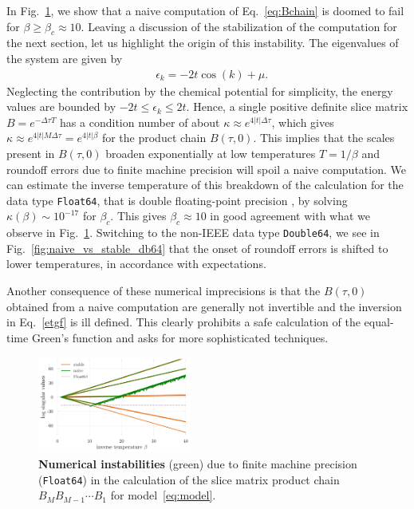\documentclass[%
 reprint,
superscriptaddress,
citeautoscript,
showpacs,
 amsmath,amssymb,
 aps,
 prb,
longbibliography,
]{revtex4-2}
\begin{document}
In Fig.~\ref{fig:naive_vs_stable}, we show that a naive computation of Eq.~\ref{eq:Bchain} is doomed to fail for $\beta \geq \beta_c \approx 10$. Leaving a discussion of the stabilization of the computation for the next section, let us highlight the origin of this instability. The eigenvalues of the system are given by
\begin{align}
	&\epsilon_k = -2t\cos(k) + \mu.
\end{align}
Neglecting the contribution by the chemical potential for simplicity, the energy values are bounded by $-2t \leq \epsilon_k \leq 2t$. Hence, a single positive definite slice matrix $B = e^{-\Delta \tau T}$ has a condition number of about $\kappa \approx e^{4|t|\Delta \tau}$, which gives $\kappa \approx e^{4|t|M\Delta \tau} = e^{4|t|\beta}$ for  the product chain $B(\tau, 0)$. This implies that the scales present in $B(\tau, 0)$ broaden exponentially at low temperatures $T=1/\beta$ and roundoff errors due to finite machine precision will spoil a naive computation. We can estimate the inverse temperature of this breakdown of the calculation for the data type \texttt{Float64}, that is double floating-point precision \cite{Goldberg1991}, by solving $\kappa(\beta) \sim 10^{-17}$ for $\beta_c$. This gives $\beta_c \approx 10$ in good agreement with what we observe in Fig.~\ref{fig:naive_vs_stable}. Switching to the non-IEEE data type \texttt{Double64}, we see in Fig.~\ref{fig:naive_vs_stable_db64} that the onset of roundoff errors is shifted to lower temperatures, in accordance with expectations.

Another consequence of these numerical imprecisions is that the $B(\tau, 0)$ obtained from a naive computation are generally not invertible and the inversion in Eq.~\ref{etgf} is ill defined. This clearly prohibits a safe calculation of the equal-time Green's function and asks for more sophisticated techniques.

\begin{figure}[t]
	\includegraphics[width=0.45\textwidth]{figures/naive_vs_stable.pdf}
	\caption{\textbf{Numerical instabilities} (green) due to finite machine precision (\texttt{Float64}) in the calculation of the slice matrix product chain $B_M B_{M-1} \cdots B_1$ for model~\eqref{eq:model}. \label{fig:naive_vs_stable}}
\end{figure}
\end{document}
